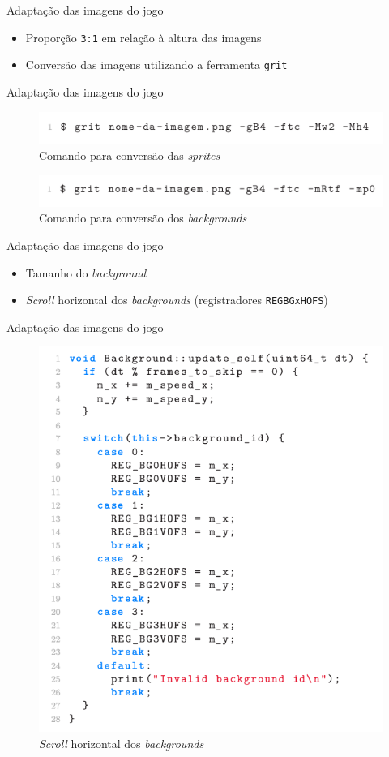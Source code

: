 \documentclass[notes, mathserif]{beamer}
\begin{document}
\begin{frame}{Adapta\c c\~ao das imagens do jogo}
	\begin{itemize}[<+->]
		\item Propor\c c\~ao \texttt{3:1} em rela\c c\~ao \`a altura das imagens
		\item Convers\~ao das imagens utilizando a ferramenta \texttt{grit}
	\end{itemize}
\end{frame}

\begin{frame}{Adapta\c c\~ao das imagens do jogo}
	\begin{figure}[H]
		\includegraphics[width=.8\linewidth]{figuras/grit-sprite.png}
		\centering
		\caption{Comando para convers\~ao das \textit{sprites}}
		\label{fig:vsync}
	\end{figure}

	\begin{figure}[H]
		\includegraphics[width=.8\linewidth]{figuras/grit-background.png}
		\centering
		\caption{Comando para convers\~ao dos \textit{backgrounds}}
		\label{fig:vsync}
	\end{figure}
\end{frame}

\begin{frame}{Adapta\c c\~ao das imagens do jogo}
	\begin{itemize}[<+->]
		\item Tamanho do \textit{background}
		\item \textit{Scroll} horizontal dos \textit{backgrounds} (registradores \texttt{REGBGxHOFS})
	\end{itemize}
\end{frame}

\begin{frame}{Adapta\c c\~ao das imagens do jogo}
	\begin{figure}[H]
		\includegraphics[width=.5\linewidth]{figuras/bg-scroll.png}
		\centering
		\caption{\textit{Scroll} horizontal dos \textit{backgrounds}}
		\label{fig:vsync}
	\end{figure}
\end{frame}
\end{document}
